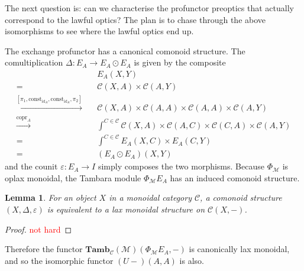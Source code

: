 \documentclass[11pt,a4paper]{article}
\theoremstyle{plain}
\newtheorem{lemma}[theorem]{Lemma}
\theoremstyle{definition}
\newcommand{\C}{\mathscr{C}}
\newcommand{\M}{\mathscr{M}}
\newcommand{\Pastro}{\Phi}
\newcommand{\Tamb}{\mathbf{Tamb}}
\newcommand{\id}{\mathrm{id}}
\newcommand{\const}{\mathrm{const}}
\DeclareMathOperator{\copr}{copr}
\newcommand{\todo}[1]{\textcolor{red}{\small #1}}
\begin{document}
The next question is: can we characterise the profunctor preoptics that actually correspond to the lawful optics? The plan is to chase through the above isomorphisms to see where the lawful optics end up.

The exchange profunctor has a canonical comonoid structure. The comultiplication $\Delta : E_A \to E_A \odot E_A$ is given by the composite
\begin{align*}
&E_A(X,Y) \\
= \quad& \C(X, A) \times \C(A, Y) \\
\xrightarrow{[\pi_1, \const_{\id_A}, \const_{\id_A}, \pi_2]} \quad& \C(X, A) \times \C(A, A) \times \C(A, A) \times \C(A, Y) \\
\xrightarrow{\copr_A} \quad& \int^{C \in \C} \C(X, A) \times \C(A, C) \times \C(C, A) \times \C(A, Y) \\
= \quad& \int^{C \in \C} E_A(X,C) \times E_A(C,Y) \\
= \quad&  (E_A \odot E_A)(X,Y)
\end{align*}
and the counit $\varepsilon : E_A \to I$ simply composes the two morphisms. Because $\Pastro_\M$ is oplax monoidal, the Tambara module $\Pastro_\M E_A$ has an induced comonoid structure.

\begin{lemma}
For an object $X$ in a monoidal category $\C$, a comonoid structure $(X,\Delta,\varepsilon)$ is equivalent to a lax monoidal structure on $\C(X, -)$.
\end{lemma}
\begin{proof}
\todo{not hard}
\end{proof}

Therefore the functor $\Tamb_\C(\M)(\Pastro_\M E_A, -)$ is canonically lax monoidal, and so the isomorphic functor $(U-)(A,A)$ is also.
\end{document}
